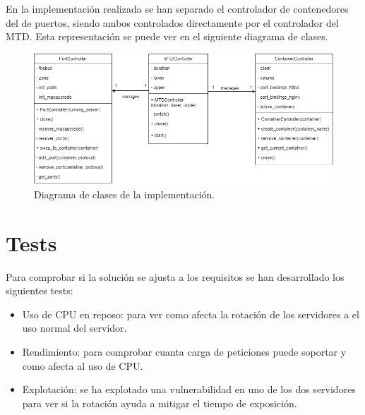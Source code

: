 En la implementación realizada se han separado el controlador de contenedores del de puertos, siendo ambos controlados directamente por el controlador del MTD. Esta representación se puede ver en el siguiente diagrama de clases.

\begin{figure}[H]
    \centering
    \includegraphics[width=\linewidth]{./imagenes/clases.png}
    \caption{Diagrama de clases de la implementación.}
\end{figure}


\section{Tests}
Para comprobar si la solución se ajusta a los requisitos se han desarrollado los siguientes tests:
\begin{itemize} 
    \item Uso de CPU en reposo: para ver como afecta la rotación de los servidores a el uso normal del servidor. 
    \item Rendimiento: para comprobar cuanta carga de peticiones puede soportar y como afecta al uso de CPU.
    \item Explotación: se ha explotado una vulnerabilidad en uno de los dos servidores para ver si la rotación ayuda a mitigar el tiempo de exposición.
\end{itemize}
